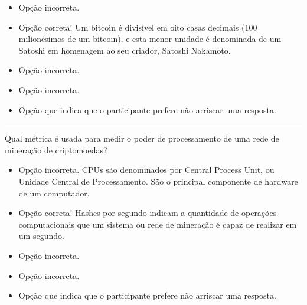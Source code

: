 \begin{itemize}
	\item {} 
	
	Opção incorreta. 
	
	\item {}  
	
	Opção correta!
	Um bitcoin é divisível em oito casas decimais (100 milionésimos de um bitcoin), e esta menor unidade é denominada de  um Satoshi em homenagem ao seu criador, Satoshi Nakamoto.
	
	\item {}
	
	Opção incorreta.  
	
	\item {} 
	
	Opção incorreta. 
	 
	\item {} 
	
	Opção que indica que o participante prefere não arriscar uma resposta.
	
\end{itemize}

\rule{\linewidth}{0.5mm} 

  Qual métrica é usada para medir o poder de processamento de uma rede de
  mineração de criptomoedas?

\begin{itemize}

	\item {} 
	
	 Opção incorreta. CPUs  são denominados por Central Process Unit, ou Unidade Central de Processamento. São o principal componente de hardware de um computador.
	 
	\item {}
	
	 Opção correta!  Hashes por segundo indicam a quantidade de operações computacionais que um sistema ou  rede de mineração é capaz de realizar em um segundo.
	 
	\item {}
	
	Opção incorreta.
	
	\item {} 
	
	Opção incorreta.
	
	\item {}
	
	Opção que indica que o participante prefere não arriscar uma resposta.
	
\end{itemize}


 
